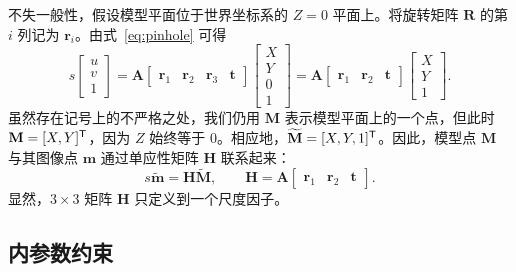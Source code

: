 不失一般性，假设模型平面位于世界坐标系的 $Z=0$ 平面上。将旋转矩阵 $\mathbf R$ 的第 $i$ 列记为 $\mathbf r_i$。由式~\eqref{eq:pinhole} 可得
\begin{equation*}
    s\begin{bmatrix}u\\v\\1\end{bmatrix}
    =\mathbf A
    \begin{bmatrix}\mathbf r_1 & \mathbf r_2 & \mathbf r_3 & \mathbf t\end{bmatrix}
    \begin{bmatrix}X\\Y\\0\\1\end{bmatrix}
    =\mathbf A
    \begin{bmatrix}\mathbf r_1 & \mathbf r_2 & \mathbf t\end{bmatrix}
    \begin{bmatrix}X\\Y\\1\end{bmatrix}.
\end{equation*}
虽然存在记号上的不严格之处，我们仍用 $\mathbf M$ 表示模型平面上的一个点，但此时 $\mathbf M=[X,Y]^{\mathsf{T}}$，因为 $Z$ 始终等于 0。相应地，$\widetilde{\mathbf M}=[X,Y,1]^{\mathsf{T}}$。因此，模型点 $\mathbf M$ 与其图像点 $\mathbf m$ 通过单应性矩阵 $\mathbf H$ 联系起来：
\begin{equation}
    s\widetilde{\mathbf m}=\mathbf H\widetilde{\mathbf M},
    \qquad
    \mathbf H=\mathbf A
    \begin{bmatrix}\mathbf r_1 & \mathbf r_2 & \mathbf t\end{bmatrix}.
    \label{eq:homography}
\end{equation}
显然，$3\times3$ 矩阵 $\mathbf H$ 只定义到一个尺度因子。

\subsection{内参数约束}

